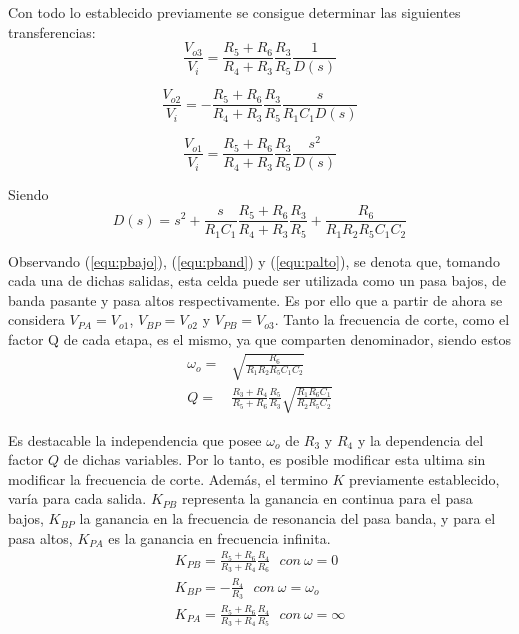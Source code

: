 Con todo lo establecido previamente se consigue determinar las siguientes transferencias:
\begin{equation}
	\frac{V_{o3}}{V_{i}} = \frac{R_5 + R_6}{R_4 + R_3} \frac{R_3}{R_5} \frac{1}{D(s)}
	\label{equ:pbajo}
\end{equation}

\begin{equation}
	\frac{V_{o2}}{V_{i}} = -\frac{R_5 + R_6}{R_4 + R_3} \frac{R_3}{R_5} \frac{s}{R_1 C_1 D(s)}
	\label{equ:pband}
\end{equation}

\begin{equation}
	\frac{V_{o1}}{V_{i}} = \frac{R_5 + R_6}{R_4 + R_3} \frac{R_3}{R_5} \frac{s^2}{D(s)}
	\label{equ:palto}
\end{equation}

Siendo
\begin{equation}
	D(s) = s^2 + \frac{s}{R_1 C_1} \frac{R_5 + R_6}{R_4 + R_3} \frac{R_3}{R_5} + \frac{R_6}{R_1 R_2 R_5 C_1 C_2}
\end{equation}

Observando (\ref{equ:pbajo}), (\ref{equ:pband}) y (\ref{equ:palto}), se denota que, tomando cada una de dichas salidas, esta celda puede ser utilizada como un pasa bajos, de banda pasante y pasa altos respectivamente. Es por ello que a partir de ahora se considera $V_{PA} = V_{o1}$, $V_{BP} = V_{o2}$ y $V_{PB} = V_{o3}$. Tanto la frecuencia de corte, como el factor Q de cada etapa, es el mismo, ya que comparten denominador, siendo estos
\begin{equation}
\begin{split}
	\omega_o = & \sqrt{\frac{R_6}{R_1 R_2 R_5 C_1 C_2}} \\
	Q = & \frac{R_3 + R_4}{R_5 + R_6} \frac{R_5}{R_3} \sqrt{\frac{R_1 R_6 C_1}{R_2 R_5 C_2}} 
\end{split}
\end{equation}

Es destacable la independencia que posee $\omega_o$ de $R_3$ y $R_4$ y la dependencia del factor $Q$ de dichas variables. Por lo tanto, es posible modificar esta ultima sin modificar la frecuencia de corte. Además, el termino $K$ previamente establecido, varía para cada salida. $K_{PB}$ representa la ganancia en continua para el pasa bajos, $K_{BP}$ la ganancia en la frecuencia de resonancia del pasa banda, y para el pasa altos, $K_{PA}$ es la ganancia en frecuencia infinita.
\begin{equation}
\begin{split}
	K_{PB} = \frac{R_5 + R_6}{R_3 + R_4} \frac{R_4}{R_6}	\	\	\ con \ \omega = 0 \\
	K_{BP} = -\frac{R_4}{R_3}	\	\	\ con \ \omega = \omega_o \\
	K_{PA} = \frac{R_5 + R_6}{R_3 + R_4} \frac{R_4}{R_5}	\	\	\ con \ \omega = \infty	
\end{split}
\end{equation}

